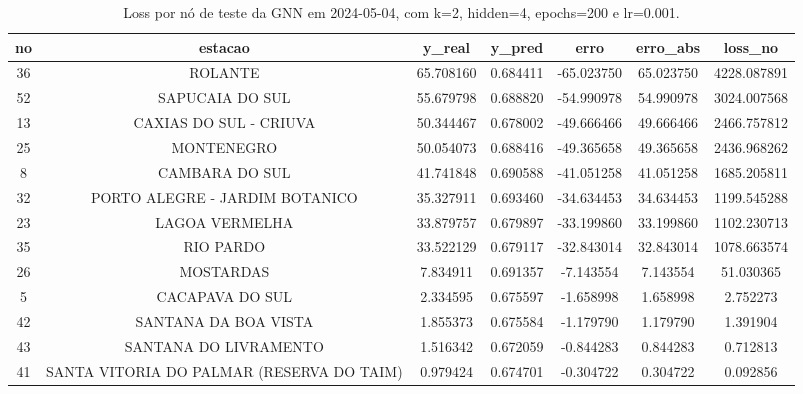 \begin{table}[h]
\centering
\caption{Loss por nó de teste da GNN em 2024-05-04, com k=2, hidden=4, epochs=200 e lr=0.001.}
\label{tab:gnn_loss_nodes_k2_hidden4}
\begin{tabular}{ccccccc}
\toprule
no & estacao & y\_real & y\_pred & erro & erro\_abs & loss\_no \\
\midrule
36 & ROLANTE & 65.708160 & 0.684411 & -65.023750 & 65.023750 & 4228.087891 \\
52 & SAPUCAIA DO SUL & 55.679798 & 0.688820 & -54.990978 & 54.990978 & 3024.007568 \\
13 & CAXIAS DO SUL - CRIUVA & 50.344467 & 0.678002 & -49.666466 & 49.666466 & 2466.757812 \\
25 & MONTENEGRO & 50.054073 & 0.688416 & -49.365658 & 49.365658 & 2436.968262 \\
8 & CAMBARA DO SUL & 41.741848 & 0.690588 & -41.051258 & 41.051258 & 1685.205811 \\
32 & PORTO ALEGRE - JARDIM BOTANICO & 35.327911 & 0.693460 & -34.634453 & 34.634453 & 1199.545288 \\
23 & LAGOA VERMELHA & 33.879757 & 0.679897 & -33.199860 & 33.199860 & 1102.230713 \\
35 & RIO PARDO & 33.522129 & 0.679117 & -32.843014 & 32.843014 & 1078.663574 \\
26 & MOSTARDAS & 7.834911 & 0.691357 & -7.143554 & 7.143554 & 51.030365 \\
5 & CACAPAVA DO SUL & 2.334595 & 0.675597 & -1.658998 & 1.658998 & 2.752273 \\
42 & SANTANA DA BOA VISTA & 1.855373 & 0.675584 & -1.179790 & 1.179790 & 1.391904 \\
43 & SANTANA DO LIVRAMENTO & 1.516342 & 0.672059 & -0.844283 & 0.844283 & 0.712813 \\
41 & SANTA VITORIA DO PALMAR (RESERVA DO TAIM) & 0.979424 & 0.674701 & -0.304722 & 0.304722 & 0.092856 \\
\bottomrule
\end{tabular}
\end{table}

